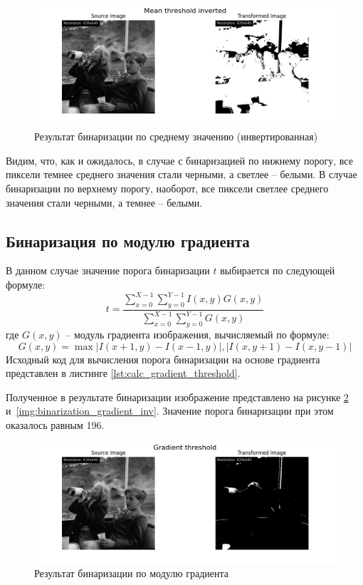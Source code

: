 \begin{figure}[ht!]
    \centering
    \includegraphics[width=\textwidth]{../results/Mean threshold inverted.png}
    \caption{Результат бинаризации по среднему значению (инвертированная)}
    \label{img:binarization_mean_inv}
\end{figure}

Видим, что, как и ожидалось, в случае с бинаризацией по нижнему порогу, все пиксели темнее среднего значения стали черными, а светлее -- белыми. В случае бинаризации по верхнему порогу, наоборот, все пиксели светлее среднего значения стали черными, а темнее -- белыми.


\FloatBarrier
\subsection{Бинаризация по модулю градиента}
В данном случае значение порога бинаризации $t$ выбирается по следующей формуле:
\begin{equation}
    t = \frac{\sum_{x = 0}^{X - 1}\sum_{y = 0}^{Y - 1}I(x, y)G(x, y)}{\sum_{x = 0}^{X - 1}\sum_{y = 0}^{Y - 1}G(x, y)}
\end{equation} 
где $G(x, y)$ -- модуль градиента изображения, вычисляемый по формуле: 
\begin{equation}
    G(x, y) = \max{|I(x + 1, y) - I(x - 1, y)|, |I(x, y + 1) - I(x, y - 1)|}
\end{equation}
Исходный код для вычисления порога бинаризации на основе градиента представлен в листинге \ref{lst:calc_gradient_threshold}.

Полученное в результате бинаризации изображение представлено на рисунке \ref{img:binarization_gradient} и~\ref{img:binarization_gradient_inv}. Значение порога бинаризации при этом оказалось равным 196.
\begin{figure}[ht!]
    \centering
    \includegraphics[width=\textwidth]{../results/Gradient threshold.png}
    \caption{Результат бинаризации по модулю градиента}
    \label{img:binarization_gradient}
\end{figure}

